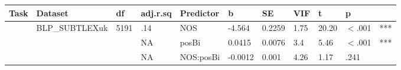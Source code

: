\begin{table}[ht]
\centering
\begingroup\normalsize
\begin{tabular}{lllllllllll}
  \hline
Task & Dataset & df & adj.r.sq & Predictor & b & SE & VIF & t & p &  \\ 
  \hline
 & BLP\_SUBTLEXuk & 5191 & .14 & NOS & -4.564 & 0.2259 & 1.75 & 20.20 & $<$.001 & *** \\ 
   &  &  & NA & posBi & 0.0415 & 0.0076 & 3.4 & 5.46 & $<$.001 & *** \\ 
   &  &  & NA & NOS:posBi & -0.0012 & 0.001 & 4.26 & 1.17 & .241 &   \\ 
   \hline
\end{tabular}
\endgroup
\end{table}
